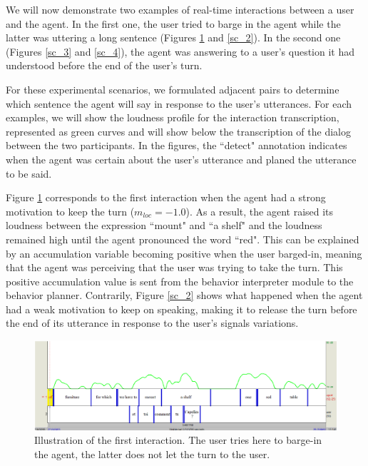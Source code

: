 We will now demonstrate two examples of real-time interactions between a user and the agent. In the first one, the user tried to barge in the agent while the latter was uttering a long sentence (Figures \ref{sc_1} and \ref{sc_2}). In the second one  (Figures \ref{sc_3} and \ref{sc_4}), the agent was answering to a user's question it had understood before the end of the user's turn. 
 
For these experimental scenarios, we formulated adjacent pairs to determine which sentence the agent will say in response to the user's utterances. 
For each examples, we will show the loudness profile for the interaction transcription, represented as green curves and will show below the transcription of the dialog between the two participants. In the figures, the ``detect" annotation indicates when the agent was certain about the user's utterance and planed the utterance to be said. 



Figure \ref{sc_1} corresponds to the first interaction when the agent had a strong motivation to keep the turn ($m_{loc}=-1.0$). 
As a result, the agent raised its loudness between the expression ``mount" and ``a shelf" and the loudness remained high until the agent pronounced the word ``red". This can be explained by an accumulation variable becoming positive when the user barged-in, meaning that the agent was perceiving that the user was trying to take the turn. This positive accumulation value is sent from the behavior interpreter module to the behavior planner. 
Contrarily, Figure \ref{sc_2} shows what happened when the agent had a weak motivation to keep on speaking, making it to release the turn before the end of its utterance in response to the user's signals variations.

\begin{figure}
  \centering
  \includegraphics[width=\linewidth]{figure/volume_transcript_1_1.png}
  \caption{Illustration of the first interaction. The user tries here to barge-in the agent, the latter does not let the turn to the user.}
  \label{sc_1}
\end{figure}

